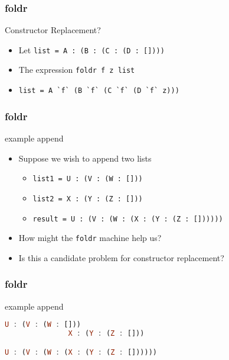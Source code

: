 \begin{frame}
\frametitle{foldr}

\begin{block}{Constructor Replacement?}

\begin{itemize}
\item Let \lstinline[basicstyle=\ttfamily]$list = A : (B : (C : (D : [])))$
\item The expression \lstinline[basicstyle=\ttfamily, mathescape]!foldr f z list!
\item \lstinline[basicstyle=\ttfamily]$list = A `f` (B `f` (C `f` (D `f` z)))$
\end{itemize}

\end{block}

\end{frame}


\begin{frame}
\frametitle{foldr}

\begin{block}{example \textemdash append}

\begin{itemize}
\item Suppose we wish to append two lists 
  \begin{itemize}
  \item \lstinline[basicstyle=\ttfamily]$list1 = U : (V : (W : []))$
  \item \lstinline[basicstyle=\ttfamily]$list2 = X : (Y : (Z : []))$
  \item \lstinline[basicstyle=\ttfamily]$result = U : (V : (W : (X : (Y : (Z : [])))))$
  \end{itemize}
\item How might the \lstinline[basicstyle=\ttfamily]$foldr$ machine help us?
\item Is this a candidate problem for constructor replacement?
\end{itemize}

\end{block}

\end{frame}


\begin{frame}[fragile]
\frametitle{foldr}

\begin{block}{example \textemdash append}

\begin{lstlisting}[language=haskell]
U : (V : (W : []))
               X : (Y : (Z : []))

U : (V : (W : (X : (Y : (Z : [])))))
\end{lstlisting}

\end{block}

\end{frame}


